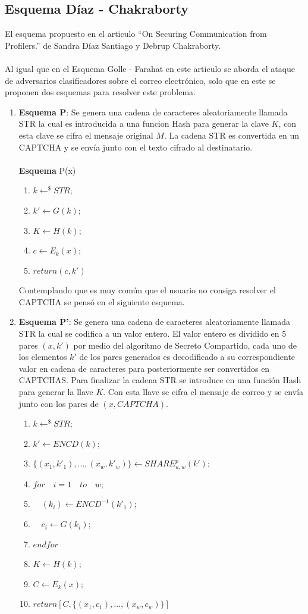\documentclass[12pt,oneside,onecolumn,openany]{report}
\begin{document}
\subsection{Esquema Díaz - Chakraborty}
El esquema propuesto en el articulo ``On Securing Communication from Profilers.'' de Sandra Díaz Santiago y Debrup Chakraborty.\cite{clas}\\\\
Al igual que en el Esquema Golle - Farahat en este articulo se aborda el ataque de adversarios clasificadores sobre el correo electrónico, solo que en este se proponen dos esquemas para resolver este problema.
\begin{enumerate}
 \item \textbf{Esquema P}: Se genera una cadena de caracteres aleatoriamente llamada STR la cual es introducida a una funcion Hash para generar la clave $K$, con esta clave se cifra el mensaje original $M$. La cadena STR es convertida en un CAPTCHA y se envía junto con el texto cifrado al destinatario.\\\\
 \textbf{Esquema} P(x)
 \begin{enumerate}
  \item $k\longleftarrow^\$ STR;$
  \item $k'\longleftarrow G(k);$
  \item $K\longleftarrow H(k);$
  \item $c\longleftarrow E_k(x);$
  \item $return(c,k')$
 \end{enumerate}
 Contemplando que es muy común que el usuario no consiga resolver el CAPTCHA se pensó en el siguiente esquema.
 \item \textbf{Esquema P'}: Se genera una cadena de caracteres aleatoriamente llamada STR la cual se codifica a un valor entero. El valor entero es dividido en 5 pares $(x,k')$ por medio del algoritmo de Secreto Compartido, cada uno de los elementos $k'$ de los pares generados es decodificado a su correspondiente valor en cadena de caracteres para posteriormente ser convertidos en CAPTCHAS. Para finalizar la cadena STR se introduce en una función Hash para generar la llave $K$. Con esta llave se cifra el mensaje de correo y se envía junto con los pares de $(x,CAPTCHA)$.
 \begin{enumerate}
  \item $k\longleftarrow^\$STR;$
  \item $k'\longleftarrow ENCD(k);$
  \item $\{(x_1,k'_1),...,(x_w,k'_w)\}\longleftarrow SHARE^p_{u,w}(k');$
  \item $for\quad i=1\quad to \quad w;$
  \item $\quad (k_i)\longleftarrow ENCD^{-1}(k'_1);$
  \item $\quad c_i\longleftarrow G(k_i);$
  \item $end for$
  \item $K\longleftarrow H(k);$
  \item $C\longleftarrow E_k(x);$
  \item $return [C,\{(x_1,c_1),...,(x_w,c_w)\}]$
 \end{enumerate}

\end{enumerate}
\end{document}
